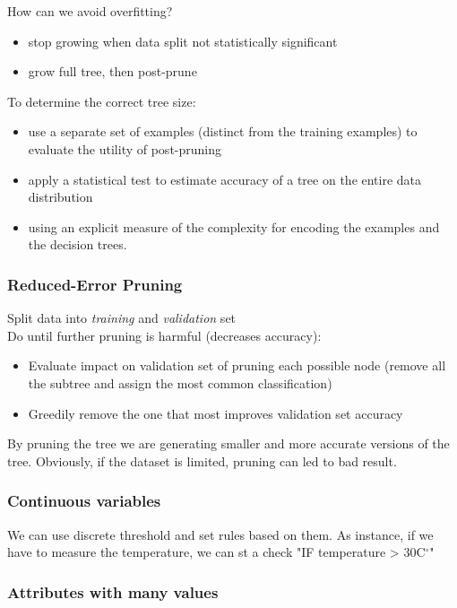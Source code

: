 \vspace{0.5cm}

How can we avoid overfitting?
\begin{itemize}
    \item stop growing when data split not statistically significant
    \item grow full tree, then post-prune
\end{itemize}

To determine the correct tree size:
\begin{itemize}
    \item use a separate set of examples (distinct from the training examples) to evaluate the utility of post-pruning
    \item apply a statistical test to estimate accuracy of a tree on the entire data distribution
    \item using an explicit measure of the complexity for encoding the examples and the decision trees.
\end{itemize}

\subsubsection{Reduced-Error Pruning}

Split data into \emph{training} and \emph{validation} set \\
Do until further pruning is harmful (decreases accuracy):
\begin{itemize}
    \item Evaluate impact on validation set of pruning each possible node (remove all the subtree and assign the most common classification)
    \item Greedily remove the one that most improves validation set accuracy
\end{itemize}

By pruning the tree we are generating smaller and more accurate versions of the tree. Obviously, if the dataset is limited, pruning can led to bad result.

\subsubsection{Continuous variables}
 We can use discrete threshold and set rules based on them. As instance, if we have to measure the temperature, we can st a check "IF temperature > 30C$^{\circ}$"

\subsubsection{Attributes with many values}

